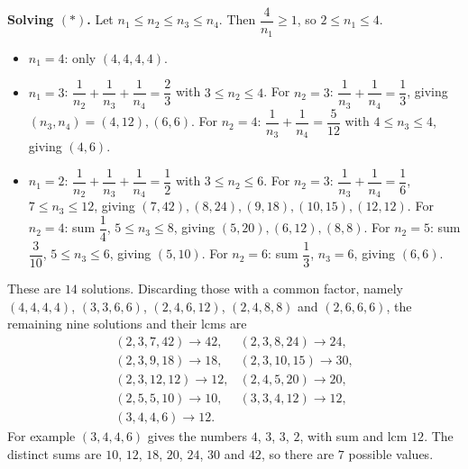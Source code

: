 \textbf{Solving $(\ast)$.} Let $n_1\le n_2\le n_3\le n_4$. Then $\dfrac{4}{n_1}\ge1$, so $2\le n_1\le4$.
\begin{itemize}
\item $n_1=4$: only $(4,4,4,4)$.
\item $n_1=3$: $\dfrac{1}{n_2}+\dfrac{1}{n_3}+\dfrac{1}{n_4}=\dfrac{2}{3}$ with $3\le n_2\le4$. For $n_2=3$: $\dfrac{1}{n_3}+\dfrac{1}{n_4}=\dfrac{1}{3}$, giving $(n_3,n_4)=(4,12),(6,6)$. For $n_2=4$: $\dfrac{1}{n_3}+\dfrac{1}{n_4}=\dfrac{5}{12}$ with $4\le n_3\le4$, giving $(4,6)$.
\item $n_1=2$: $\dfrac{1}{n_2}+\dfrac{1}{n_3}+\dfrac{1}{n_4}=\dfrac{1}{2}$ with $3\le n_2\le6$. For $n_2=3$: $\dfrac{1}{n_3}+\dfrac{1}{n_4}=\dfrac{1}{6}$, $7\le n_3\le12$, giving $(7,42),(8,24),(9,18),(10,15),(12,12)$. For $n_2=4$: sum $\dfrac{1}{4}$, $5\le n_3\le8$, giving $(5,20),(6,12),(8,8)$. For $n_2=5$: sum $\dfrac{3}{10}$, $5\le n_3\le6$, giving $(5,10)$. For $n_2=6$: sum $\dfrac{1}{3}$, $n_3=6$, giving $(6,6)$.
\end{itemize}
These are $14$ solutions. Discarding those with a common factor, namely $(4,4,4,4)$, $(3,3,6,6)$, $(2,4,6,12)$, $(2,4,8,8)$ and $(2,6,6,6)$, the remaining nine solutions and their lcms are
\[
\begin{array}{ll}
(2,3,7,42)\to42, & (2,3,8,24)\to24,\\
(2,3,9,18)\to18, & (2,3,10,15)\to30,\\
(2,3,12,12)\to12, & (2,4,5,20)\to20,\\
(2,5,5,10)\to10, & (3,3,4,12)\to12,\\
(3,4,4,6)\to12 . &
\end{array}
\]
For example $(3,4,4,6)$ gives the numbers $4$, $3$, $3$, $2$, with sum and lcm $12$. The distinct sums are $10$, $12$, $18$, $20$, $24$, $30$ and $42$, so there are $\boxed{7}$ possible values.
